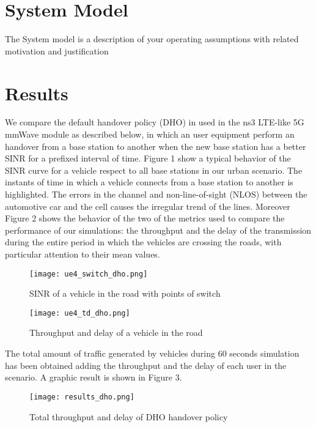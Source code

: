 \documentclass[conference,10pt]{IEEEtran}
\begin{document}
\section{System Model}\label{sec:symo}
The System model is a description of your operating assumptions with related motivation and justification

\section{Results}\label{sec:res}
We compare the default handover policy (DHO) in used in the ns3 LTE-like 5G mmWave module as 
described below, in which an user equipment perform an handover from a base station to another when the new base station has a better SINR for a prefixed interval of time. Figure 1 show a typical behavior of the SINR curve for a vehicle respect to all base stations in our urban scenario. The instants of time in which a vehicle connects from a base station to another is highlighted. The errors in the channel and non-line-of-sight (NLOS) between the automotive car and the cell causes the irregular trend of the lines. Moreover Figure 2 shows the behavior of the two of the metrics used to compare the performance of our simulations: the throughput and the delay of the transmission during the entire period in which the vehicles are crossing the roads, with particular attention to their mean values.

\begin{figure*}[h]
\texttt{[image: ue4\_switch\_dho.png]}
\caption{SINR of a vehicle in the road with points of switch}
\texttt{[image: ue4\_td\_dho.png]}
\caption{Throughput and delay of a vehicle in the road}
\end{figure*}

The total amount of traffic generated by vehicles during 60 seconds simulation has been obtained adding the throughput and the delay of each user in the scenario. A graphic result is shown in Figure 3.
\begin{figure*}[h]
\texttt{[image: results\_dho.png]}
\caption{Total throughput and delay of DHO handover policy}
\end{figure*}
\end{document}
